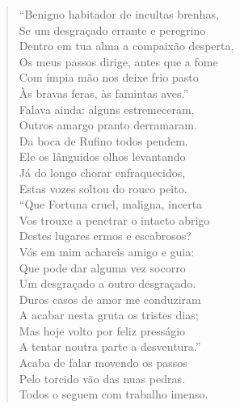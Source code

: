 \begin{verse}
``Benigno habitador de incultas brenhas,\\ 
Se um desgraçado errante e peregrino\\
Dentro em tua alma a compaixão desperta,\\
Os meus passos dirige, antes que a fome\\
Com ímpia mão nos deixe frio pasto\\
Às bravas feras, às famintas aves.'' \\[10pt] 


Falava ainda: alguns estremeceram,\\
Outros amargo pranto derramaram.\\
Da boca de Rufino todos pendem.\\
Ele os lânguidos olhos levantando\\
Já do longo chorar enfraquecidos,\\
Estas vozes soltou do rouco peito.\\         
``Que Fortuna cruel, maligna, incerta\\			\index{\Fortu}
Vos trouxe a penetrar o intacto abrigo\\
Destes lugares ermos e escabrosos?\\
Vós em mim achareis amigo e guia:\\
Que pode dar alguma vez socorro\\
Um desgraçado a outro desgraçado.\\
Duros casos de amor me conduziram\\
A acabar nesta gruta os tristes dias;\\
Mas hoje volto por feliz presságio\\
A tentar noutra parte a desventura.'' \\[10pt]


Acaba de falar movendo os passos\\
Pelo torcido vão das nuas pedras.\\
Todos o seguem com trabalho imenso. \\[10pt]



\end{verse}
